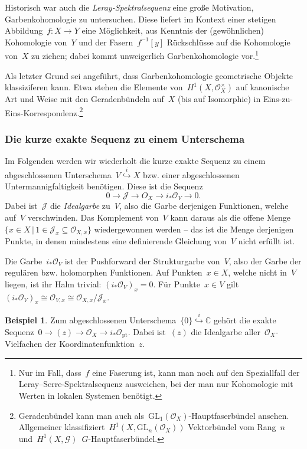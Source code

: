 \documentclass[a4paper,ngerman,12pt]{scrartcl}
\theoremstyle{definition}
\newtheorem{ex}[defn]{Beispiel}
\theoremstyle{plain}
\theoremstyle{remark}
\newcommand{\CC}{\mathbb{C}}
\newcommand{\G}{\mathcal{G}}
\newcommand{\J}{\mathcal{J}}
\renewcommand{\O}{\mathcal{O}}
\newcommand{\GL}{\mathrm{GL}}
\newcommand{\pt}{\mathrm{pt}}
\newcommand{\lra}{\longrightarrow}
\begin{document}
Historisch war auch die \emph{Leray-Spektralsequenz} eine große Motivation,
Garbenkohomologie zu untersuchen. Diese liefert im Kontext einer stetigen
Abbildung~$f : X \to Y$ eine Möglichkeit, aus Kenntnis der (gewöhnlichen)
Kohomologie von~$Y$ und der Fasern~$f^{-1}[y]$ Rückschlüsse auf die Kohomologie
von~$X$ zu ziehen; dabei kommt unweigerlich Garbenkohomologie vor.\footnote{Nur
im Fall, dass~$f$ eine Faserung ist, kann man noch auf den Speziallfall der
Leray--Serre-Spek\-tral\-sequenz ausweichen, bei der man nur Kohomologie mit Werten
in lokalen Systemen benötigt.}

Als letzter Grund sei angeführt, dass Garbenkohomologie geometrische Objekte
klassiziferen kann. Etwa stehen die Elemente von~$H^1(X,\O_X^\times)$ auf
kanonische Art und Weise mit den Geradenbündeln auf~$X$ (bis auf Isomorphie) in
Eins-zu-Eins-Korrespondenz.\footnote{Geradenbündel kann man auch
als~$\GL_1(\O_X)$-Hauptfaserbündel ansehen. Allgemeiner
klassifiziert~$H^1(X,\GL_n(\O_X))$ Vektorbündel vom Rang~$n$
und~$H^1(X,\G)$~$G$-Hauptfaserbündel.}


\subsubsection*{Die kurze exakte Sequenz zu einem Unterschema}

Im Folgenden werden wir wiederholt die kurze exakte Sequenz zu einem
abgeschlossenen Unterschema~$V \stackrel{i}{\hookrightarrow} X$ bzw. einer
abgeschlossenen Untermannigfaltigkeit benötigen. Diese ist die Sequenz
\[ 0 \lra \J \lra O_X \lra i_*\O_V \lra 0. \]
Dabei ist~$\J$ die \emph{Idealgarbe} zu~$V$, also die Garbe derjenigen
Funktionen, welche auf~$V$ verschwinden. Das Komplement von~$V$ kann daraus als
die offene Menge~$\{ x \in X \,|\, 1 \in \J_x \subseteq \O_{X,x} \}$
wiedergewonnen werden -- das ist die Menge derjenigen Punkte, in denen
mindestens eine definierende Gleichung von~$V$ nicht erfüllt ist.

Die Garbe~$i_* \O_V$ ist der Pushforward der Strukturgarbe von~$V$, also der
Garbe der regulären bzw. holomorphen Funktionen. Auf Punkten~$x \in X$, welche
nicht in~$V$ liegen, ist ihr Halm trivial: $(i_*\O_V)_x = 0$. Für Punkte~$x \in
V$ gilt~$(i_*\O_V)_x \cong \O_{V,x} \cong \O_{X,x}/\J_x$.

\begin{ex}Zum abgeschlossenen Unterschema~$\{0\} \stackrel{i}{\hookrightarrow} \CC$ gehört
die exakte Sequenz~$0 \to (z) \to \O_X \to i_*\O_\pt$. Dabei ist~$(z)$ die
Idealgarbe aller~$\O_X$-Vielfachen der Koordinatenfunktion~$z$.\end{ex}
\end{document}
